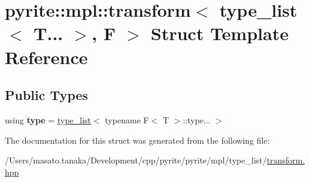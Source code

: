 \hypertarget{structpyrite_1_1mpl_1_1transform_3_01type__list_3_01_t_8_8_8_01_4_00_01_f_01_4}{}\section{pyrite\+:\+:mpl\+:\+:transform$<$ type\+\_\+list$<$ T... $>$, F $>$ Struct Template Reference}
\label{structpyrite_1_1mpl_1_1transform_3_01type__list_3_01_t_8_8_8_01_4_00_01_f_01_4}
\subsection*{Public Types}
\begin{DoxyCompactItemize}
\item 
\mbox{\label{structpyrite_1_1mpl_1_1transform_3_01type__list_3_01_t_8_8_8_01_4_00_01_f_01_4_ad5ebc0efe3da4bd2f00fa1dcf161c4e7}} 
using {\bfseries type} = \mbox{\hyperlink{structpyrite_1_1core_1_1mpl_1_1type__list}{type\+\_\+list}}$<$ typename F$<$ T $>$\+::type... $>$
\end{DoxyCompactItemize}


The documentation for this struct was generated from the following file\+:\begin{DoxyCompactItemize}
\item 
/\+Users/masato.\+tanaka/\+Development/cpp/pyrite/pyrite/mpl/type\+\_\+list/\mbox{\hyperlink{transform_8hpp}{transform.\+hpp}}\end{DoxyCompactItemize}
